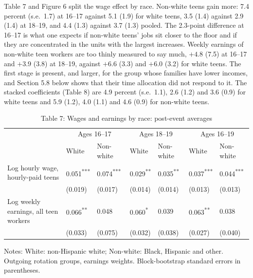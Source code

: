 \documentclass[12pt]{article}
\begin{document}
Table 7 and Figure 6 split the wage effect by race. Non-white teens gain more: 7.4 percent (s.e.\ 1.7) at 16--17 against 5.1 (1.9) for white teens, 3.5 (1.4) against 2.9 (1.4) at 18--19, and 4.4 (1.3) against 3.7 (1.3) pooled. The 2.3-point difference at 16--17 is what one expects if non-white teens' jobs sit closer to the floor and if they are concentrated in the units with the largest increases. Weekly earnings of non-white teen workers are too thinly measured to say much, $+4.8$ (7.5) at 16--17 and $+3.9$ (3.8) at 18--19, against $+6.6$ (3.3) and $+6.0$ (3.2) for white teens. The first stage is present, and larger, for the group whose families have lower incomes, and Section 5.8 below shows that their time allocation did not respond to it. The stacked coefficients (Table 8) are 4.9 percent (s.e.\ 1.1), 2.6 (1.2) and 3.6 (0.9) for white teens and 5.9 (1.2), 4.0 (1.1) and 4.6 (0.9) for non-white teens.

\begin{table}
\centering
\caption{Table 7: Wages and earnings by race: post-event averages}

\small
\begin{tabular}{p{}p{}p{}p{}p{}p{}p{}}
\toprule
 & \multicolumn{2}{c}{Ages 16--17} & \multicolumn{2}{c}{Ages 18--19} & \multicolumn{2}{c}{Ages 16--19} \\

 & White & Non-white & White & Non-white & White & Non-white \\
\midrule
Log hourly wage, hourly-paid teens & 0.051\textsuperscript{***} & 0.074\textsuperscript{***} & 0.029\textsuperscript{**} & 0.035\textsuperscript{**} & 0.037\textsuperscript{***} & 0.044\textsuperscript{***} \\
 & (0.019) & (0.017) & (0.014) & (0.014) & (0.013) & (0.013) \\
Log weekly earnings, all teen workers & 0.066\textsuperscript{**} & 0.048 & 0.060\textsuperscript{*} & 0.039 & 0.063\textsuperscript{**} & 0.038 \\
 & (0.033) & (0.075) & (0.032) & (0.038) & (0.027) & (0.040) \\
\bottomrule
\end{tabular}



\noindent\small Notes: White: non-Hispanic white; Non-white: Black, Hispanic and other. Outgoing rotation groups, earnings weights. Block-bootstrap standard errors in parentheses.

\end{table}
\end{document}
